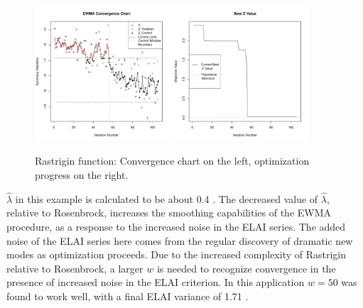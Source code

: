 \documentclass{article}
\def \rastVar {
        1.71
}
\def \rastLamb {
        0.4
}
\begin{document}
%
%
\begin{figure}[!htb]
        \centering
        \includegraphics[width=0.45\textwidth]{./figures/ewmaConvChartRastHardEnd.pdf}
        \includegraphics[width=0.45\textwidth]{./figures/bestZRastHardEnd.pdf}
        \caption{Rastrigin function: Convergence chart on the left, optimization progress on the right.}
        \label{fig:rastrigin}
\end{figure}
%
%


$\hat\lambda$ in this example is calculated to be about \rastLamb. The 
decreased value of $\hat\lambda$, relative to Rosenbrock, increases the 
smoothing capabilities of the EWMA procedure, as a response to the increased 
noise in the ELAI series. The added noise of the ELAI series here comes from 
the regular discovery of dramatic new modes as optimization proceeds. Due to 
the increased complexity of Rastrigin relative to Rosenbrock, a larger $w$ is 
needed to recognize convergence in the presence of increased noise in the ELAI 
criterion. In this application $w=50$ was found to work well, with a final 
ELAI variance of \rastVar.
\end{document}
